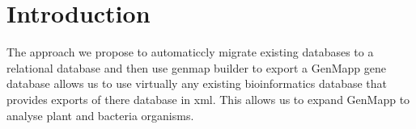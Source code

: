 \section{Introduction}
  The approach we propose to automaticcly migrate existing databases to a relational database and then use genmap builder to export a GenMapp gene database allows us to use virtually any existing bioinformatics database that provides exports of there database in xml.  This allows us to expand GenMapp to analyse plant and bacteria organisms.  


